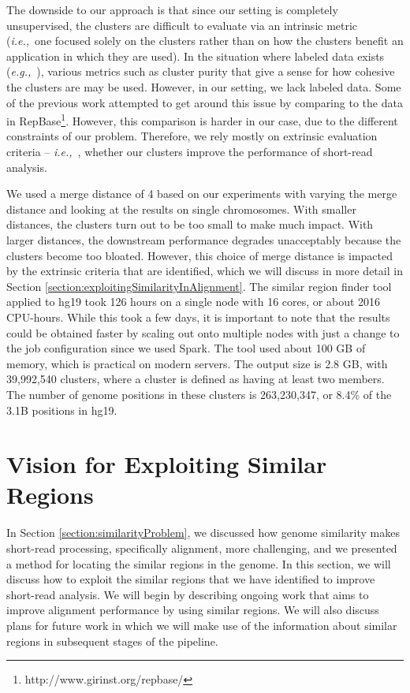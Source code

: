 \documentclass[twocolumn,10pt]{article}
\newcommand{\ie}{{\em i.e.,}~}
\newcommand{\eg}{{\em e.g.,}~}
\begin{document}
The downside to our approach is that since our setting is completely unsupervised, the clusters are difficult to evaluate via an intrinsic metric (\ie one focused solely on the clusters rather than on how the clusters benefit an application in which they are used).  In the situation where labeled data exists (\eg \cite{Cohen:2005}), various metrics such as cluster purity that give a sense for how cohesive the clusters are may be used.  However, in our setting, we lack labeled data.  Some of the previous work attempted to get around this issue by comparing to the data in RepBase\footnote{http://www.girinst.org/repbase/}.  However, this comparison is harder in our case, due to the different constraints of our problem.  Therefore, we rely mostly on extrinsic evaluation criteria -- \ie, whether our clusters improve the performance of short-read analysis.

We used a merge distance of 4 based on our experiments with varying the merge distance and looking at the results on single chromosomes.  With smaller distances, the clusters turn out to be too small to make much impact.  With larger distances, the downstream performance degrades unacceptably because the clusters become too bloated.  However, this choice of merge distance is impacted by the extrinsic criteria that are identified, which we will discuss in more detail in Section \ref{section:exploitingSimilarityInAlignment}.  The similar region finder tool applied to hg19 took 126 hours on a single node with 16 cores, or about 2016 CPU-hours.  While this took a few days, it is important to note that the results could be obtained faster by scaling out onto multiple nodes with just a change to the job configuration since we used Spark.  The tool used about 100 GB of memory, which is practical on modern servers.  The output size is 2.8 GB, with 39,992,540 clusters, where a cluster is defined as having at least two members.  The number of genome positions in these clusters is 263,230,347, or 8.4\% of the 3.1B positions in hg19.

\section{Vision for Exploiting Similar Regions}
\label{section:visionExploitingSimilarRegions}

In Section \ref{section:similarityProblem}, we discussed how genome similarity makes short-read processing, specifically alignment, more challenging, and we presented a method for locating the similar regions in the genome.  In this section, we will discuss how to exploit the similar regions that we have identified to improve short-read analysis.  We will begin by describing ongoing work that aims to improve alignment performance by using similar regions.  We will also discuss plans for future work in which we will make use of the information about similar regions in subsequent stages of the pipeline.
\end{document}
